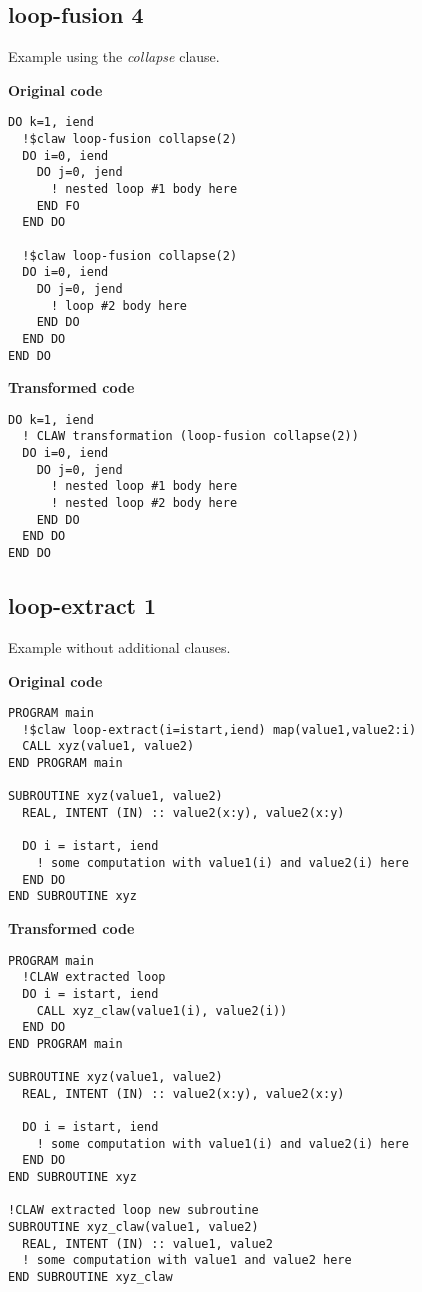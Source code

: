 \documentclass{article}
\begin{document}
\subsection{loop-fusion 4}
\label{loop-fusion4}
Example using the \textit{collapse} clause. 

\textbf{Original code}
\begin{lstlisting}
DO k=1, iend
  !$claw loop-fusion collapse(2)
  DO i=0, iend
    DO j=0, jend
      ! nested loop #1 body here
    END FO
  END DO

  !$claw loop-fusion collapse(2)
  DO i=0, iend
    DO j=0, jend
      ! loop #2 body here
    END DO
  END DO
END DO
\end{lstlisting}


\textbf{Transformed code}
\begin{lstlisting}
DO k=1, iend
  ! CLAW transformation (loop-fusion collapse(2))
  DO i=0, iend
    DO j=0, jend
      ! nested loop #1 body here
      ! nested loop #2 body here
    END DO
  END DO
END DO
\end{lstlisting}



\subsection{loop-extract 1}
\label{loop-extract1}
Example without additional clauses. 

\textbf{Original code}
\begin{lstlisting}
PROGRAM main
  !$claw loop-extract(i=istart,iend) map(value1,value2:i)
  CALL xyz(value1, value2)
END PROGRAM main

SUBROUTINE xyz(value1, value2)
  REAL, INTENT (IN) :: value2(x:y), value2(x:y)

  DO i = istart, iend
    ! some computation with value1(i) and value2(i) here
  END DO
END SUBROUTINE xyz
\end{lstlisting}


\textbf{Transformed code}
\begin{lstlisting}
PROGRAM main
  !CLAW extracted loop
  DO i = istart, iend
    CALL xyz_claw(value1(i), value2(i))
  END DO
END PROGRAM main

SUBROUTINE xyz(value1, value2)
  REAL, INTENT (IN) :: value2(x:y), value2(x:y)

  DO i = istart, iend
    ! some computation with value1(i) and value2(i) here
  END DO
END SUBROUTINE xyz

!CLAW extracted loop new subroutine
SUBROUTINE xyz_claw(value1, value2)
  REAL, INTENT (IN) :: value1, value2
  ! some computation with value1 and value2 here
END SUBROUTINE xyz_claw
\end{lstlisting}
\end{document}
